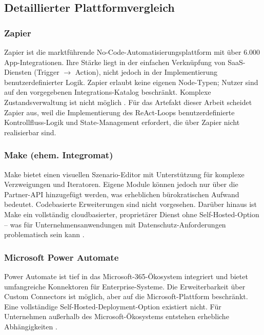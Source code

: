 \documentclass[12pt,a4paper,oneside]{report}
\begin{document}
\subsection{Detaillierter Plattformvergleich}

\subsubsection{Zapier}

Zapier ist die marktführende No-Code-Automatisierungsplattform mit über 6.000
App-Integrationen. Ihre Stärke liegt in der einfachen Verknüpfung von SaaS-Diensten
(Trigger $\to$ Action), nicht jedoch in der Implementierung benutzerdefinierter Logik.
Zapier erlaubt keine eigenen Node-Typen; Nutzer sind auf den vorgegebenen Integrations-Katalog
beschränkt. Komplexe Zustandsverwaltung ist nicht möglich \cite{luo2021characteristics}.
Für das Artefakt dieser Arbeit scheidet Zapier aus, weil die Implementierung des
ReAct-Loops benutzerdefinierte Kontrollfluss-Logik und State-Management erfordert,
die über Zapier nicht realisierbar sind.

\subsubsection{Make (ehem. Integromat)}

Make bietet einen visuellen Szenario-Editor mit Unterstützung für komplexe
Verzweigungen und Iteratoren. Eigene Module können jedoch nur über die Partner-\ac{API}
hinzugefügt werden, was erheblichen bürokratischen Aufwand bedeutet. Codebasierte
Erweiterungen sind nicht vorgesehen. Darüber hinaus ist Make ein vollständig cloudbasierter,
proprietärer Dienst ohne Self-Hosted-Option -- was für Unternehmensanwendungen mit
Datenschutz-Anforderungen problematisch sein kann \cite{luo2021characteristics}.

\subsubsection{Microsoft Power Automate}

Power Automate ist tief in das Microsoft-365-Ökosystem integriert und bietet
umfangreiche Konnektoren für Enterprise-Systeme. Die Erweiterbarkeit über Custom
Connectors ist möglich, aber auf die Microsoft-Plattform beschränkt. Eine
vollständige Self-Hosted-Deployment-Option existiert nicht. Für Unternehmen außerhalb
des Microsoft-Ökosystems entstehen erhebliche Abhängigkeiten \cite{luo2021characteristics}.
\end{document}
